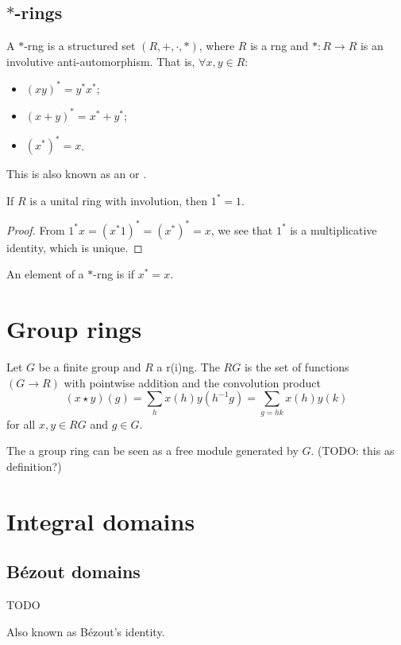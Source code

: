 \subsection{$*$-rings}
\begin{definition}
A $*$-rng is a structured set $(R,+,\cdot, *)$, where $R$ is a rng and $*:R\to R$ is an involutive anti-automorphism. That is, $\forall x,y\in R$:
\begin{itemize}
\item $(xy)^* = y^*x^*$;
\item $(x+y)^* = x^* + y^*$;
\item $(x^*)^* = x$.
\end{itemize}
This is also known as an  or .
\end{definition}
\begin{lemma}
If $R$ is a unital ring with involution, then $1^* = 1$.
\end{lemma}
\begin{proof}
From $1^*x = (x^*1)^* = (x^*)^* = x$, we see that $1^*$ is a multiplicative identity, which is unique.
\end{proof}
\begin{definition}
An element of a $*$-rng is  if $x^* = x$.
\end{definition}

\section{Group rings}
\begin{definition}
Let $G$ be a finite group and $R$ a r(i)ng. The  $RG$ is the set of functions $(G\to R)$ with pointwise addition and the convolution product
\[ (x\star y)(g) = \sum_h x(h)y(h^{-1}g) = \sum_{g=hk}x(h)y(k) \]
for all $x,y\in RG$ and $g\in G$. 
\end{definition}
The a group ring can be seen as a free module generated by $G$. (TODO: this as definition?)

\section{Integral domains}

\subsection{Bézout domains}
\begin{theorem}
TODO
\end{theorem}
Also known as Bézout's identity.

